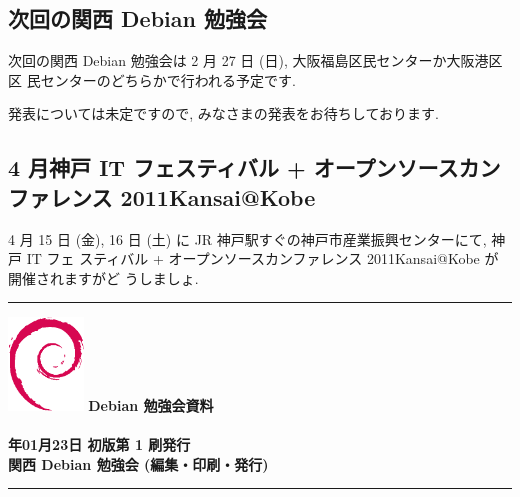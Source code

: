\documentclass[mingoth,a4paper]{jsarticle}
\newcommand{\debmtgyear}{2011}
\newcommand{\debmtgdate}{23}
\newcommand{\debmtgmonth}{01}
\begin{document}

\subsection{次回の関西 Debian 勉強会}
次回の関西 Debian 勉強会は 2 月 27 日 (日), 大阪福島区民センターか大阪港区区
民センターのどちらかで行われる予定です.

発表については未定ですので, みなさまの発表をお待ちしております.

\subsection{4 月神戸 IT フェスティバル + オープンソースカンファレンス 2011Kansai@Kobe}

4 月 15 日 (金), 16 日 (土) に JR 神戸駅すぐの神戸市産業振興センターにて, 神戸 IT フェ
スティバル + オープンソースカンファレンス 2011Kansai@Kobe が開催されますがど
うしましょ.




 \begin{minipage}[b]{0.2\hsize}
 \end{minipage}
 \begin{minipage}[b]{0.8\hsize}

 \vspace*{15cm}
 \rule{\hsize}{1mm}
 \vspace{2mm}
 \includegraphics[width=2cm]{image200502/openlogo-nd.eps}
 \noindent \Large \bf Debian 勉強会資料\\ \\
 \noindent \normalfont \debmtgyear{}年\debmtgmonth{}月\debmtgdate{}日 \hspace{5mm}  初版第 1 刷発行\\
 \noindent \normalfont 関西 Debian 勉強会 (編集・印刷・発行)\\
 \rule{\hsize}{1mm}
 \end{minipage}
\end{document}

